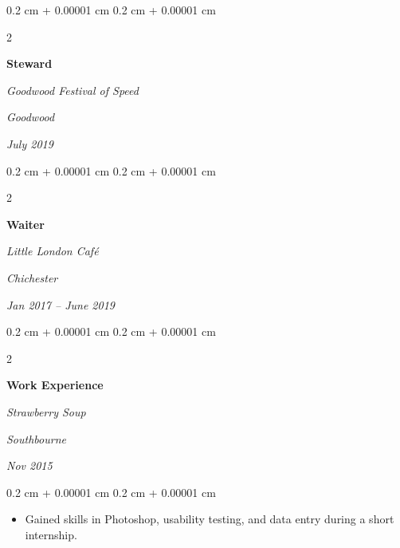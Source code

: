 \documentclass[10pt, a4paper]{article}
\newenvironment{highlights}{
    \begin{itemize}[
        topsep=0.10 cm,
        parsep=0.10 cm,
        partopsep=0pt,
        itemsep=0pt,
        leftmargin=0.4 cm + 10pt
    ]
}{
    \end{itemize}
} %
\newenvironment{onecolentry}{
    \begin{adjustwidth}{
        0.2 cm + 0.00001 cm
    }{
        0.2 cm + 0.00001 cm
    }
}{
    \end{adjustwidth}
} %
\newenvironment{twocolentry}[2][]{
    \onecolentry
    \def\secondColumn{#2}
    \setcolumnwidth{\fill, 4.5 cm}
    \begin{paracol}{2}
}{
    \switchcolumn \raggedleft \secondColumn
    \end{paracol}
    \endonecolentry
} %
\begin{document}
        \vspace{0.2 cm}

        \begin{twocolentry}{
        \textit{Goodwood}    
            
        \textit{July 2019}}
            \textbf{Steward}
            
            \textit{Goodwood Festival of Speed}
        \end{twocolentry}



        \vspace{0.2 cm}

        \begin{twocolentry}{
        \textit{Chichester}    
            
        \textit{Jan 2017 – June 2019}}
            \textbf{Waiter}
            
            \textit{Little London Café}
        \end{twocolentry}



        \vspace{0.2 cm}

        \begin{twocolentry}{
        \textit{Southbourne}    
            
        \textit{Nov 2015}}
            \textbf{Work Experience}
            
            \textit{Strawberry Soup}
        \end{twocolentry}

        \vspace{0.10 cm}
        \begin{onecolentry}
            \begin{highlights}
                \item Gained skills in Photoshop, usability testing, and data entry during a short internship.
            \end{highlights}
        \end{onecolentry}



    
\end{document}
